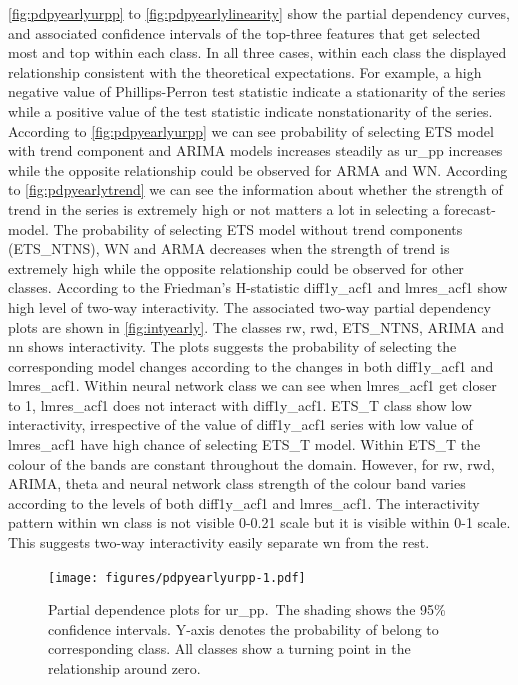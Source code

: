 \documentclass[11pt,a4paper,]{article}
\begin{document}
\autoref{fig:pdpyearlyurpp} to \autoref{fig:pdpyearlylinearity} show the partial dependency curves, and associated confidence intervals of the top-three features that get selected most and top within each class. In all three cases, within each class the displayed relationship consistent with the theoretical expectations. For example, a high negative value of Phillips-Perron test statistic indicate a stationarity of the series while a positive value of the test statistic indicate nonstationarity of the series. According to \autoref{fig:pdpyearlyurpp} we can see probability of selecting ETS model with trend component and ARIMA models increases steadily as ur\_pp increases while the opposite relationship could be observed for ARMA and WN. According to \autoref{fig:pdpyearlytrend} we can see the information about whether the strength of trend in the series is extremely high or not matters a lot in selecting a forecast-model. The probability of selecting ETS model without trend components (ETS\_NTNS), WN and ARMA decreases when the strength of trend is extremely high while the opposite relationship could be observed for other classes. According to the Friedman's H-statistic diff1y\_acf1 and lmres\_acf1 show high level of two-way interactivity. The associated two-way partial dependency plots are shown in \autoref{fig:intyearly}. The classes rw, rwd, ETS\_NTNS, ARIMA and nn shows interactivity. The plots suggests the probability of selecting the corresponding model changes according to the changes in both diff1y\_acf1 and lmres\_acf1. Within neural network class we can see when lmres\_acf1 get closer to 1, lmres\_acf1 does not interact with diff1y\_acf1. ETS\_T class show low interactivity, irrespective of the value of diff1y\_acf1 series with low value of lmres\_acf1 have high chance of selecting ETS\_T model. Within ETS\_T the colour of the bands are constant throughout the domain. However, for rw, rwd, ARIMA, theta and neural network class strength of the colour band varies according to the levels of both diff1y\_acf1 and lmres\_acf1. The interactivity pattern within wn class is not visible 0-0.21 scale but it is visible within 0-1 scale. This suggests two-way interactivity easily separate wn from the rest.

\begin{figure}
\centering
\texttt{[image: figures/pdpyearlyurpp-1.pdf]}
\caption{\label{fig:pdpyearlyurpp}Partial dependence plots for ur\_pp.~The shading shows the 95\% confidence intervals. Y-axis denotes the probability of belong to corresponding class. All classes show a turning point in the relationship around zero.}
\end{figure}
\end{document}
